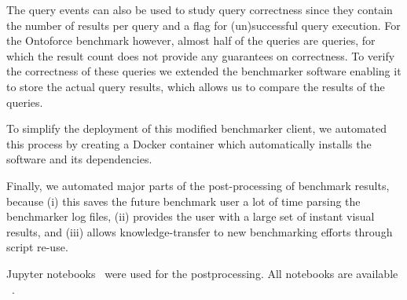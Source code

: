 \begin{table}[htbp!]
	\centering
	\caption{Schema of the query events used for all benchmark results in this work}
	\label{table:queryevents}
\end{table}

The query events can also be used to study query correctness since they contain the number of results per query and a flag for (un)successful query execution. For the Ontoforce benchmark however, almost half of the queries are  queries, for which the result count does not provide any guarantees on correctness. 
To verify the correctness of these queries we extended the benchmarker software enabling it to store the actual query results, which allows us to compare the results of the  queries. 

To simplify the deployment of this modified benchmarker client, we automated this process by creating a Docker container which automatically installs the software and its dependencies.

Finally, we automated major parts of the post-processing of benchmark results, because (i) this saves the future benchmark user a lot of time parsing the benchmarker log files, (ii) provides the user with a large set of instant visual results, and (iii) allows knowledge-transfer to new benchmarking efforts through script re-use.

Jupyter notebooks~\cite{jupyter} were used for the postprocessing. All notebooks are available ~\cite{bmpostprocessing}. 

